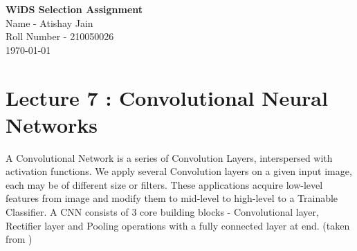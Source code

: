 \documentclass[12pt,a4paper]{article}
\begin{document}
\setlength{\parindent}{0cm}
\begin{center}
{\textbf {\huge WiDS Selection Assignment}}\\[5mm]
{\large Name - Atishay Jain \\ \vspace{0.5 ex} Roll Number - 210050026} \\[5mm]
\today\\[5mm] %
\end{center}


\section{Lecture 7 : Convolutional Neural Networks}
A Convolutional Network is a series of Convolution Layers, interspersed with activation functions. We apply several Convolution layers on a given input image, each may be of different size or filters. These applications acquire low-level features from image and modify them to mid-level to high-level to a Trainable Classifier. A CNN consists of 3 core building blocks - Convolutional layer, Rectifier layer and Pooling operations with a fully connected layer at end. (taken from \textcite{CS231n})
\end{document}
